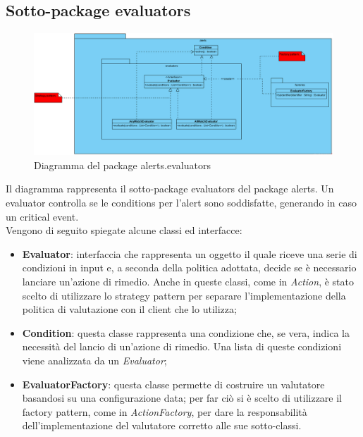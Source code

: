         \subsection{Sotto-package evaluators}

            \begin{figure}[htbp]
                \centering
                \includegraphics[width=\textwidth]{./img/DiagrammiClasse/evaluators.png}
                \caption[Diagramma del package alerts.evaluators]{Diagramma del package alerts.evaluators}
            \end{figure}
            Il diagramma rappresenta il sotto-package evaluators del package alerts. Un evaluator controlla se 
            le conditions per l'alert sono soddisfatte, generando in caso un critical event.\\
            Vengono di seguito spiegate alcune classi ed interfacce:
            \begin{itemize}
            	\item \textbf{Evaluator}: interfaccia che rappresenta un oggetto il quale riceve una serie 
            		di condizioni in input e, a seconda della politica adottata, decide se è 
            		necessario lanciare un'azione di rimedio. Anche in queste classi, come in \textit{Action}, 
            		è stato scelto di utilizzare lo strategy pattern per separare l'implementazione della politica
            		di valutazione con il client che lo utilizza;
            	\item \textbf{Condition}: questa classe rappresenta una condizione che, se vera,
            		indica la necessità del lancio di un'azione di rimedio. Una lista di queste condizioni viene analizzata da un \textit{Evaluator};
            	\item \textbf{EvaluatorFactory}: questa classe permette di costruire un valutatore basandosi 
            		su una configurazione data; per far ciò si è scelto di utilizzare il factory pattern, come 
            		in \textit{ActionFactory}, per dare la responsabilità dell'implementazione del valutatore 
            		corretto alle sue sotto-classi.
            \end{itemize}

